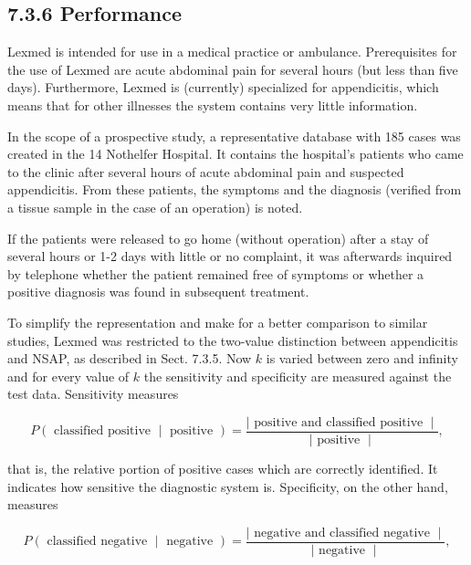 \documentclass[10pt]{article}
\begin{document}
\subsection*{7.3.6 Performance}
Lexmed is intended for use in a medical practice or ambulance. Prerequisites for the use of Lexmed are acute abdominal pain for several hours (but less than five days). Furthermore, Lexmed is (currently) specialized for appendicitis, which means that for other illnesses the system contains very little information.

In the scope of a prospective study, a representative database with 185 cases was created in the 14 Nothelfer Hospital. It contains the hospital's patients who came to the clinic after several hours of acute abdominal pain and suspected appendicitis. From these patients, the symptoms and the diagnosis (verified from a tissue sample in the case of an operation) is noted.

If the patients were released to go home (without operation) after a stay of several hours or 1-2 days with little or no complaint, it was afterwards inquired by telephone whether the patient remained free of symptoms or whether a positive diagnosis was found in subsequent treatment.

To simplify the representation and make for a better comparison to similar studies, Lexmed was restricted to the two-value distinction between appendicitis and NSAP, as described in Sect. 7.3.5. Now $k$ is varied between zero and infinity\\
and for every value of $k$ the sensitivity and specificity are measured against the test data. Sensitivity measures


\begin{equation*}
P(\text { classified positive } \mid \text { positive })=\frac{\mid \text { positive and classified positive } \mid}{\mid \text { positive } \mid}, \tag{7.16}
\end{equation*}


that is, the relative portion of positive cases which are correctly identified. It indicates how sensitive the diagnostic system is. Specificity, on the other hand, measures


\begin{equation*}
P(\text { classified negative } \mid \text { negative })=\frac{\mid \text { negative and classified negative } \mid}{\mid \text { negative } \mid}, \tag{7.17}
\end{equation*}
\end{document}
